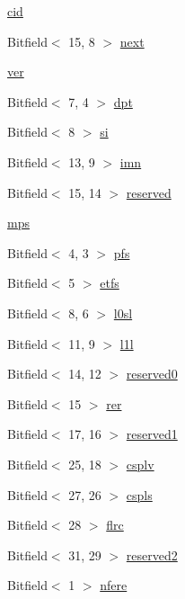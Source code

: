 \begin{DoxyCompactItemize}
\item 
\hyperlink{structPXCAP_abc570b1db8821b4150cc5694fb524fca}{cid}
\item 
Bitfield$<$ 15, 8 $>$ \hyperlink{structPXCAP_a8bb6f66c6230d47ae653bb69bad27694}{next}
\item 
\hyperlink{structPXCAP_aa7abc6e681b0a49c67b5227e08b0ea6b}{ver}
\item 
Bitfield$<$ 7, 4 $>$ \hyperlink{structPXCAP_a4a5866a2006e0267140b79b9e8789209}{dpt}
\item 
Bitfield$<$ 8 $>$ \hyperlink{structPXCAP_a29b303abae08683518785e2d3d3076ff}{si}
\item 
Bitfield$<$ 13, 9 $>$ \hyperlink{structPXCAP_a7a789af37acfd3d718dd365107908e85}{imn}
\item 
Bitfield$<$ 15, 14 $>$ \hyperlink{structPXCAP_a6212b0574d105c82a17413386478a0f4}{reserved}
\item 
\hyperlink{structPXCAP_ae9f97803a1ca682dc35f3058d9961c26}{mps}
\item 
Bitfield$<$ 4, 3 $>$ \hyperlink{structPXCAP_ae58e1d93b3ac0f04e9fcf87214ce2cde}{pfs}
\item 
Bitfield$<$ 5 $>$ \hyperlink{structPXCAP_ab4020dc834317b4c2d7f06fecd3b6201}{etfs}
\item 
Bitfield$<$ 8, 6 $>$ \hyperlink{structPXCAP_a71992206c22d427a17cb28fd7757d590}{l0sl}
\item 
Bitfield$<$ 11, 9 $>$ \hyperlink{structPXCAP_a0feff82172ca491d36e12e15d9199109}{l1l}
\item 
Bitfield$<$ 14, 12 $>$ \hyperlink{structPXCAP_a814a36b922256f7165716e2ad8d8ec26}{reserved0}
\item 
Bitfield$<$ 15 $>$ \hyperlink{structPXCAP_a830417416ae6214e35dcf051e4ad8c72}{rer}
\item 
Bitfield$<$ 17, 16 $>$ \hyperlink{structPXCAP_ae25b2a036fb201558fa30f91b285ea27}{reserved1}
\item 
Bitfield$<$ 25, 18 $>$ \hyperlink{structPXCAP_a11e2333f614dd6bd50180a088f20b0e4}{csplv}
\item 
Bitfield$<$ 27, 26 $>$ \hyperlink{structPXCAP_ab7784a8deea52769e9d0704e6d3aca7d}{cspls}
\item 
Bitfield$<$ 28 $>$ \hyperlink{structPXCAP_a88eba43ec05e1aac289375a00cd74f6a}{flrc}
\item 
Bitfield$<$ 31, 29 $>$ \hyperlink{structPXCAP_a421c519b745f1dcdf84dfb1e6ac70ad6}{reserved2}
\item 
Bitfield$<$ 1 $>$ \hyperlink{structPXCAP_aecc832ea5560f7f4a7f0ca95a6a107d0}{nfere}

\end{DoxyCompactItemize}
